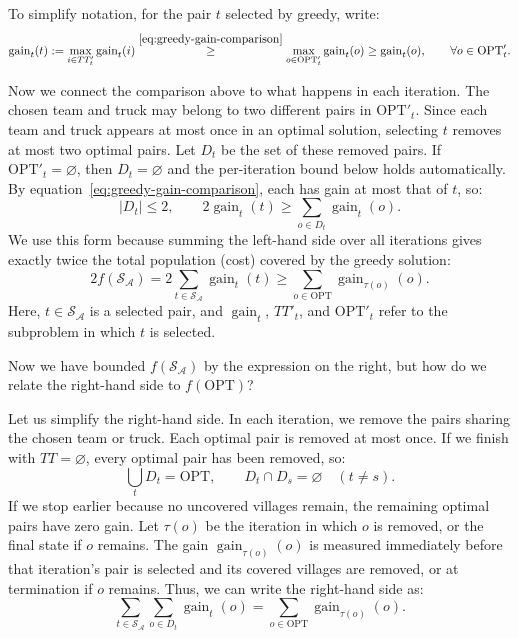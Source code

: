 \documentclass[12pt,a4paper]{article}
\begin{document}
\begin{enumerate}
To simplify notation, for the pair $t$ selected by greedy, write:
\[
\operatorname{gain}_t(t):=\max_{i\in TT'_t}\operatorname{gain}_t(i)
\overset{\eqref{eq:greedy-gain-comparison}}{\geq}
\max_{o\in\mathrm{OPT}'_t}\operatorname{gain}_t(o)
\geq\operatorname{gain}_t(o),
\qquad\forall o\in\mathrm{OPT}'_t.
\]

Now we connect the comparison above to what happens in each iteration.
The chosen team and truck may belong to two different pairs in $\mathrm{OPT}'_t$.
Since each team and truck appears at most once in an optimal solution, selecting
$t$ removes at most two optimal pairs. Let $D_t$ be the set of these removed pairs.
If $\mathrm{OPT}'_t=\varnothing$, then $D_t=\varnothing$ and the per-iteration
bound below holds automatically.
By equation~\eqref{eq:greedy-gain-comparison}, each has gain at most that of $t$, so:
\[
|D_t|\leq2,\qquad
2\operatorname{gain}_t(t)\geq\sum_{o\in D_t}\operatorname{gain}_t(o).
\]
We use this form because summing the left-hand side over all iterations gives
exactly twice the total population (cost) covered by the greedy solution:
\[
2f(\mathcal{S}_{\mathcal{A}})
=2\sum_{t\in\mathcal{S}_{\mathcal{A}}}\operatorname{gain}_t(t)
\geq\sum_{o\in\mathrm{OPT}}\operatorname{gain}_{\tau(o)}(o).
\]
Here, $t\in\mathcal{S}_{\mathcal{A}}$ is a selected pair, and
$\operatorname{gain}_t$, $TT'_t$, and $\mathrm{OPT}'_t$ refer to the subproblem
in which $t$ is selected.

Now we have bounded $f(\mathcal{S}_{\mathcal{A}})$ by the expression on the right,
but how do we relate the right-hand side to $f(\mathrm{OPT})$?

Let us simplify the right-hand side. In each iteration, we remove the pairs
sharing the chosen team or truck. Each optimal pair is removed at most once.
If we finish with $TT=\varnothing$, every optimal pair has been removed, so:
\[
\bigcup_t D_t=\mathrm{OPT},\qquad D_t\cap D_s=\varnothing\quad(t\neq s).
\]
If we stop earlier because no uncovered villages remain, the remaining optimal
pairs have zero gain. Let $\tau(o)$ be the iteration in which $o$ is removed,
or the final state if $o$ remains. The gain $\operatorname{gain}_{\tau(o)}(o)$
is measured immediately before that iteration's pair is selected and its
covered villages are removed, or at termination if $o$ remains.
Thus, we can write the right-hand side as:
\[
\sum_{t\in\mathcal{S}_{\mathcal{A}}}\sum_{o\in D_t}\operatorname{gain}_t(o)
=\sum_{o\in\mathrm{OPT}}\operatorname{gain}_{\tau(o)}(o).
\]


\end{enumerate}
\end{document}
